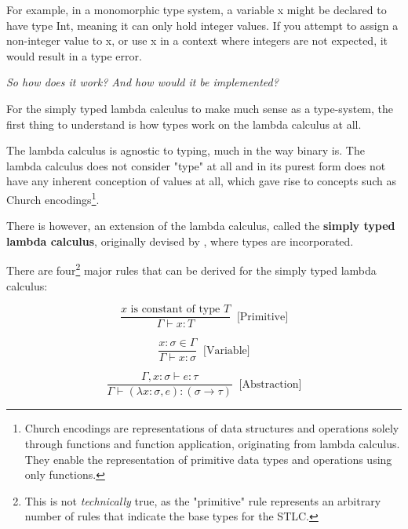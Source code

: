 \documentclass{l4proj}
\begin{document}
For example, in a monomorphic type system, a variable x might be declared to have type Int, meaning it can only hold integer values.
If you attempt to assign a non-integer value to x, or use x in a context where integers are not expected, it would result in a type error.



\emph{So how does it work? And how would it be implemented?}

For the simply typed lambda calculus to make much sense as a type-system, the first thing to understand is how types work on the lambda calculus at all.

The lambda calculus is agnostic to typing, much in the way binary is.
The lambda calculus does not consider "type" at all and in its purest form does not have any inherent conception of values at all, which gave rise to concepts such as Church encodings\footnote{Church encodings are representations of data structures and operations solely through functions and function application, originating from lambda calculus. They enable the representation of primitive data types and operations using only functions.}. 

There is however, an extension of the lambda calculus, called the \textbf{simply typed lambda calculus}, originally devised by \citet{Church_1940}, where types are incorporated.

There are four\footnote{This is not \emph{technically} true, as the "primitive" rule represents an arbitrary number of rules that indicate the base types for the STLC.} major rules that can be derived for the simply typed lambda calculus\citep{Stlc_upenn}:


\begin{equation*} \label{eq:stlc-primitives-rule}
    \frac{x\text{ is constant of type }T}{\Gamma \vdash x:T} \;\;\text{[Primitive]}
\end{equation*}

\begin{equation*} \label{eq:stlc-var-rule}
    \frac{x:\sigma \in \Gamma}{\Gamma \vdash x:\sigma} \;\;\text{[Variable]}
\end{equation*}

\begin{equation*} \label{eq:stlc-abstraction}
    \frac{\Gamma, x:\sigma \vdash e:\tau}{\Gamma \vdash (\lambda x:\sigma, e): (\sigma \rightarrow \tau)} \;\;\text{[Abstraction]}
\end{equation*}
\end{document}
